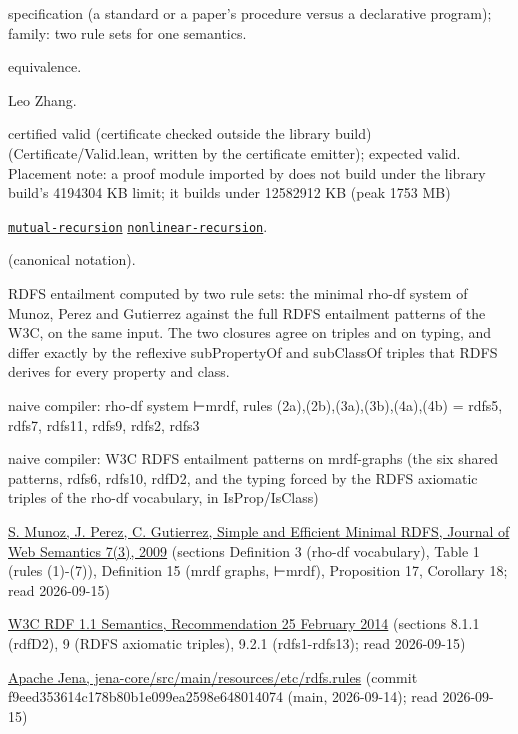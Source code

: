 \documentclass[10pt]{article}
\begin{document}
\begin{description}[leftmargin=2.6cm,style=nextline,itemsep=1pt]

\item[Category] specification (a standard or a paper's procedure versus a declarative program); family: two rule sets for one semantics.

\item[Kind] equivalence.

\item[Contributors] Leo Zhang.

\item[Status] certified valid (certificate checked outside the library build) (Certificate/Valid.lean, written by the certificate emitter); expected valid. Placement note: a proof module imported by  does not build under the library build's 4194304 KB limit; it builds under 12582912 KB (peak 1753 MB)

\item[Tags] \hyperref[tag:mutual-recursion]{\texttt{mutual-recursion}} \hyperref[tag:nonlinear-recursion]{\texttt{nonlinear-recursion}}.

\item[Input]  (canonical notation).

\item[Summary] RDFS entailment computed by two rule sets: the minimal rho-df system of Munoz, Perez and Gutierrez against the full RDFS entailment patterns of the W3C, on the same input. The two closures agree on triples and on typing, and differ exactly by the reflexive subPropertyOf and subClassOf triples that RDFS derives for every property and class.

\item[Sides] naive compiler: rho-df system ⊢mrdf, rules (2a),(2b),(3a),(3b),(4a),(4b) = rdfs5, rdfs7, rdfs11, rdfs9, rdfs2, rdfs3 \par naive compiler: W3C RDFS entailment patterns on mrdf-graphs (the six shared patterns, rdfs6, rdfs10, rdfD2, and the typing forced by the RDFS axiomatic triples of the rho-df vocabulary, in IsProp/IsClass)

\item[Sources] {\raggedright \href{https://doi.org/10.1016/j.websem.2009.07.003}{S. Munoz, J. Perez, C. Gutierrez, Simple and Efficient Minimal RDFS, Journal of Web Semantics 7(3), 2009} (sections Definition 3 (rho-df vocabulary), Table 1 (rules (1)-(7)), Definition 15 (mrdf graphs, ⊢mrdf), Proposition 17, Corollary 18; read 2026-09-15) \par \href{https://www.w3.org/TR/rdf11-mt/}{W3C RDF 1.1 Semantics, Recommendation 25 February 2014} (sections 8.1.1 (rdfD2), 9 (RDFS axiomatic triples), 9.2.1 (rdfs1-rdfs13); read 2026-09-15) \par \href{https://github.com/apache/jena/blob/main/jena-core/src/main/resources/etc/rdfs.rules}{Apache Jena, jena-core/src/main/resources/etc/rdfs.rules} (commit f9eed353614c178b80b1e099ea2598e648014074 (main, 2026-09-14); read 2026-09-15)\par}


\end{description}
\end{document}
